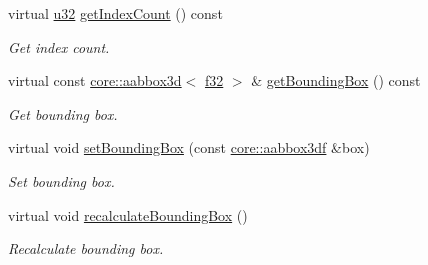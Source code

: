 \begin{DoxyCompactItemize}
\mbox{\label{structirr_1_1scene_1_1SSkinMeshBuffer_adc00b4ce3b46d952575203c6e275e592}} 
virtual \hyperlink{namespaceirr_a0416a53257075833e7002efd0a18e804}{u32} \hyperlink{structirr_1_1scene_1_1SSkinMeshBuffer_adc00b4ce3b46d952575203c6e275e592}{get\+Index\+Count} () const
\begin{DoxyCompactList}\small\item\em Get index count. \end{DoxyCompactList}\item 
\mbox{\label{structirr_1_1scene_1_1SSkinMeshBuffer_a350535b406a7607bd392d07e5c3f9401}} 
virtual const \hyperlink{classirr_1_1core_1_1aabbox3d}{core\+::aabbox3d}$<$ \hyperlink{namespaceirr_a0277be98d67dc26ff93b1a6a1d086b07}{f32} $>$ \& \hyperlink{structirr_1_1scene_1_1SSkinMeshBuffer_a350535b406a7607bd392d07e5c3f9401}{get\+Bounding\+Box} () const
\begin{DoxyCompactList}\small\item\em Get bounding box. \end{DoxyCompactList}\item 
\mbox{\label{structirr_1_1scene_1_1SSkinMeshBuffer_ab4d3b6c78a4a3cfe368af4c89350497f}} 
virtual void \hyperlink{structirr_1_1scene_1_1SSkinMeshBuffer_ab4d3b6c78a4a3cfe368af4c89350497f}{set\+Bounding\+Box} (const \hyperlink{namespaceirr_1_1core_a60f4b4c744aba55f10530d503c6ecb04}{core\+::aabbox3df} \&box)
\begin{DoxyCompactList}\small\item\em Set bounding box. \end{DoxyCompactList}\item 
\mbox{\label{structirr_1_1scene_1_1SSkinMeshBuffer_af8c6cebb57afc1264a3a153288ace5e0}} 
virtual void \hyperlink{structirr_1_1scene_1_1SSkinMeshBuffer_af8c6cebb57afc1264a3a153288ace5e0}{recalculate\+Bounding\+Box} ()
\begin{DoxyCompactList}\small\item\em Recalculate bounding box. \end{DoxyCompactList}\item 
\mbox{\label{structirr_1_1scene_1_1SSkinMeshBuffer_a8a249cbb52eba63a694bff2e4a81667b}} 

\end{DoxyCompactItemize}
